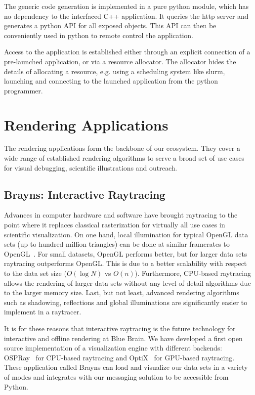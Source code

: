 \documentclass[10pt]{llncs}
\newcommand{\FIXME}[1]{\textbf{\color{BLUE}{FIXME: #1}}}
\begin{document}
The generic code generation is implemented in a pure python module, which has
no dependency to the interfaced C++ application. It queries the http server and
generates a python API for all exposed objects. This API can then be
conveniently used in python to remote control the application.

Access to the application is established either through an explicit connection
of a pre-launched application, or via a resource allocator. The allocator hides
the details of allocating a resource, e.g. using a scheduling system like
slurm, launching and connecting to the launched application from the python
programmer.

\FIXME{teaser gallery}

\section{Rendering Applications}

The rendering applications form the backbone of our ecosystem. They cover a
wide range of established rendering algorithms to serve a broad set of use
cases for visual debugging, scientific illustrations and outreach.

\subsection{Brayns: Interactive Raytracing}

Advances in computer hardware and software have brought raytracing to the point
where it replaces classical rasterization for virtually all use cases in
scientific visualization. On one hand, local illumination for typical OpenGL
data sets (up to hundred million triangles) can be done at similar framerates
to OpenGL~\cite{ospray}. For small datasets, OpenGL performs better, but for
larger data sets raytracing outperforms OpenGL. This is due to a better
scalability with respect to the data set size ($O(\log{N})$ vs $O(n)$).
Furthermore, CPU-based raytracing allows the rendering of larger data sets
without any level-of-detail algorithms due to the larger memory size. Last, but
not least, advanced rendering algorithms such as shadowing, reflections and
global illuminations are significantly easier to implement in a raytracer.

It is for these reasons that interactive raytracing is the future technology for
interactive and offline rendering at Blue Brain. We have developed a first open
source implementation of a visualization engine with different backends:
OSPRay~\cite{ospray} for CPU-based raytracing and OptiX~\cite{optix} for
GPU-based raytracing. These application called Brayns can load and visualize
our data sets in a variety of modes and integrates with our messaging solution
to be accessible from Python.
\end{document}
